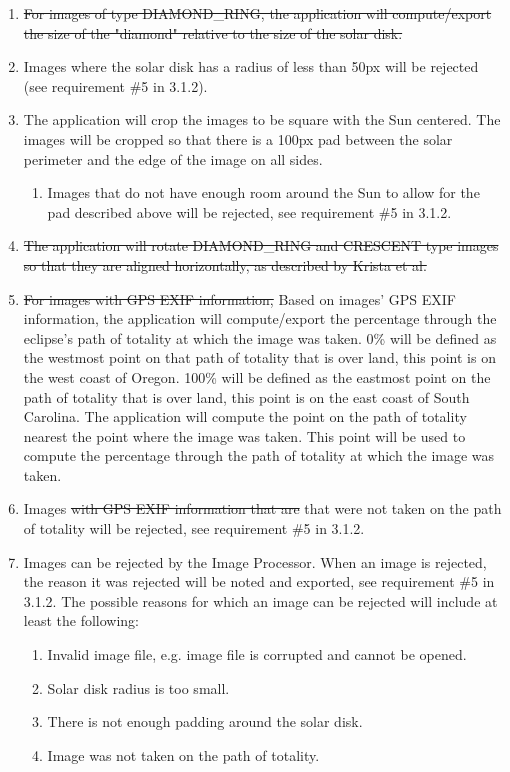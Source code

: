 \documentclass[10pt, onecolumn, draftclsnofoot, letterpaper, compsoc]{IEEEtran}
\begin{document}
\begin{enumerate}
		\item \sout{For images of type DIAMOND\_RING, the application will
		compute/export the size of the "diamond" relative to the size of
		the solar disk.}

		\item Images where the solar disk has a radius of less than 50px
		will be rejected (see requirement \#5 in 3.1.2).

		\item The application will crop the images to be square with the
		Sun centered. The images will be cropped so that there is a 100px
		pad between the solar perimeter and the edge of the image on all
		sides.
		\begin{enumerate}
			\item Images that do not have enough room around the Sun to
			allow for the pad described above will be rejected, see requirement \#5 in 3.1.2.
		\end{enumerate}

		\item \sout{The application will rotate DIAMOND\_RING and CRESCENT type
		images so that they are aligned horizontally, as described by
		Krista et al.}

		\item \sout{For images with GPS EXIF information,} Based on images' GPS EXIF information, the application will
		compute/export the percentage through the eclipse's path of
		totality at which the image was taken. 0\% will be defined as the
		westmost point on that path of totality that is over land, this
		point is on the west coast of Oregon. 100\% will be defined as the
		eastmost point on the path of totality that is over land, this
		point is on the east coast of South Carolina. The application will
		compute the point on the path of totality nearest the point where
		the image was taken. This point will be used to compute the
		percentage through the path of totality at which the image was
		taken.

		\item Images \sout{with GPS EXIF information that are} that were not taken on the path of
		totality will be rejected, see requirement \#5 in 3.1.2.

		\item Images can be rejected by the Image Processor. When an image is rejected,
		the reason it was rejected will be noted and exported, see requirement \#5 in 3.1.2.
		The possible reasons for which an image can be rejected will include at least the
		following:
		\begin{enumerate}
			\item Invalid image file, e.g. image file is corrupted and cannot be opened.

			\item Solar disk radius is too small.

			\item There is not enough padding around the solar disk.

			\item Image was not taken on the path of totality.
		\end{enumerate}

	\end{enumerate}
\end{document}
